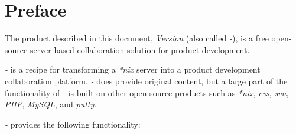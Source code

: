 \chapter{Preface}

The product described in this document, 
\emph{\productbasename{} Version \productversion{}}
(also called \emph{\productbasename{}-\productversion{}}),
is a free open-source server-based collaboration solution for 
product development.  

\emph{\productbasename{}-\productversion{}}
is a recipe for transforming 
a \emph{*nix} server into a 
product development collaboration platform.
\emph{\productbasename{}-\productversion{}} does provide
original content, but a large part of the functionality of
\emph{\productbasename{}-\productversion{}} is built
on other open-source products such as 
\emph{*nix}, \emph{cvs}, \emph{svn}, \emph{PHP}, 
\emph{MySQL}, and \emph{putty}.

\emph{\productbasename{}-\productversion{}} provides the
following functionality:

